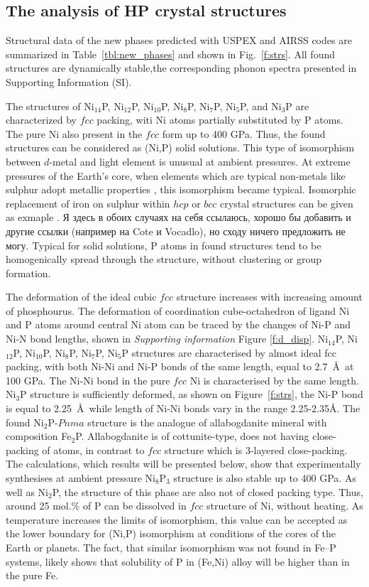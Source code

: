 \documentclass[twoside,twocolumn,9pt]{article}
\begin{document}
\subsection{The analysis of HP crystal structures}
Structural data of the new phases predicted with USPEX and AIRSS codes are summarized in Table~\ref{tbl:new_phases} and shown in Fig.~\ref{f:strs}. All found structures are dynamically stable,the corresponding phonon spectra presented in Supporting Information (SI).  

The structures of Ni$_{14}$P, Ni$_{12}$P, Ni$_{10}$P, Ni$_8$P, Ni$_7$P, Ni$_5$P, and Ni$_3$P are characterized by $fcc$ packing, witi Ni atoms partially substituted by P atoms. 
The pure Ni also present in the $fcc$ form up to 400 GPa.
Thus, the found structures can be considered as (Ni,P) solid solutions.
This type of isomorphism between $d$-metal and light element is unusual at ambient pressures.
At extreme pressures of the Earth's core, when elements which are typical non-metals like sulphur adopt metallic properties \cite{gavr2017_s}, this isomorphism became typical.
Isomorphic replacement of iron on sulphur within $hcp$ or $bcc$ crystal structures can be given as exmaple \cite{gavr2016_fes}.
Я здесь в обоих случаях на себя ссылаюсь, хорошо бы добавить и другие ссылки (например на Cote и Vocadlo), но сходу ничего предложить не могу.
Typical for solid solutions, P atoms in found structures tend to be homogenically spread through the structure, without clustering or group formation.

The deformation of the ideal cubic $fcc$ structure increases with increasing amount of phosphourus.
The deformation of coordination cube-octahedron of ligand Ni and P atoms around central Ni atom can be traced by the changes of Ni-P and Ni-N bond lengths, shown in {\it Supporting information} Figure \ref{f:d_disp}.
Ni$_{14}$P, Ni$_{12}$P, Ni$_{10}$P, Ni$_8$P, Ni$_7$P, Ni$_5$P structures are characterised by almost ideal fcc packing, with both Ni-Ni and Ni-P bonds of the same length, equal to 2.7~\AA\ at 100 GPa.
The Ni-Ni bond in the pure $fcc$ Ni is characterised by the same length.
Ni$_3$P structure is sufficiently deformed, as shown on Figure~\ref{f:strs}, the Ni-P bond is equal to 2.25~\AA\, while length of Ni-Ni bonds vary in the range 2.25-2.35\AA.
The found Ni$_2$P-$Pnma$ structure is the analogue of allabogdanite mineral with composition Fe$_2$P.
Allabogdanite is of cottunite-type, does not having close-packing of atoms, in contrast to $fcc$ structure which is 3-layered close-packing.
The calculations, which results will be presented below, show that experimentally synthesises at ambient pressure Ni$_8$P$_3$ structure is also stable up to 400 GPa.
As well as Ni$_2$P, the structure of this phase are also not of closed packing type.
Thus, around 25 mol.\% of P can be dissolved in $fcc$ structure of Ni, without heating.
As temperature increases the limits of isomorphism, this value can be accepted as the lower boundary for (Ni,P) isomorphism at conditions of the cores of the Earth or planets.
The fact, that similar isomorphism was not found in Fe--P systems, likely shows that solubility of P in (Fe,Ni) alloy will be higher than in the pure Fe.
\end{document}
